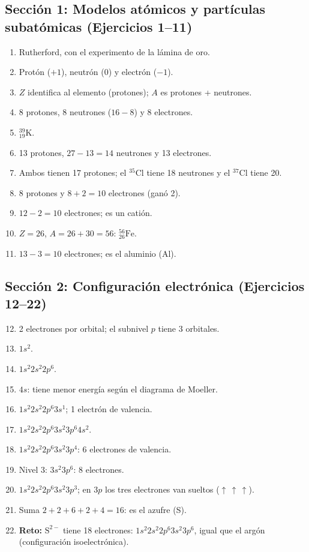 \documentclass[12pt, letterpaper]{article}
\begin{document}
  \subsection*{Sección 1: Modelos atómicos y partículas subatómicas (Ejercicios 1--11)}

  \begin{enumerate}[leftmargin=*, label=\textbf{\arabic*.}]
    \setcounter{enumi}{0}
    \item Rutherford, con el experimento de la lámina de oro.
    \item Protón ($+1$), neutrón ($0$) y electrón ($-1$).
    \item $Z$ identifica al elemento (protones); $A$ es protones + neutrones.
    \item 8 protones, 8 neutrones ($16 - 8$) y 8 electrones.
    \item ${}^{39}_{19}\text{K}$.
    \item 13 protones, $27 - 13 = 14$ neutrones y 13 electrones.
    \item Ambos tienen 17 protones; el ${}^{35}\text{Cl}$ tiene 18 neutrones y el ${}^{37}\text{Cl}$ tiene 20.
    \item 8 protones y $8 + 2 = 10$ electrones (ganó 2).
    \item $12 - 2 = 10$ electrones; es un catión.
    \item $Z = 26$, $A = 26 + 30 = 56$: ${}^{56}_{26}\text{Fe}$.
    \item $13 - 3 = 10$ electrones; es el aluminio (Al).
  \end{enumerate}

  \subsection*{Sección 2: Configuración electrónica (Ejercicios 12--22)}

  \begin{enumerate}[leftmargin=*, label=\textbf{\arabic*.}]
    \setcounter{enumi}{11}
    \item 2 electrones por orbital; el subnivel $p$ tiene 3 orbitales.
    \item $1s^{2}$.
    \item $1s^{2}2s^{2}2p^{6}$.
    \item $4s$: tiene menor energía según el diagrama de Moeller.
    \item $1s^{2}2s^{2}2p^{6}3s^{1}$; 1 electrón de valencia.
    \item $1s^{2}2s^{2}2p^{6}3s^{2}3p^{6}4s^{2}$.
    \item $1s^{2}2s^{2}2p^{6}3s^{2}3p^{4}$: 6 electrones de valencia.
    \item Nivel 3: $3s^{2}3p^{6}$: 8 electrones.
    \item $1s^{2}2s^{2}2p^{6}3s^{2}3p^{3}$; en $3p$ los tres electrones van sueltos ($\uparrow\,\uparrow\,\uparrow$).
    \item Suma $2+2+6+2+4 = 16$: es el azufre (S).
    \item \textbf{Reto:} $\text{S}^{2-}$ tiene 18 electrones: $1s^{2}2s^{2}2p^{6}3s^{2}3p^{6}$, igual que el argón (configuración isoelectrónica).
  \end{enumerate}
\end{document}
